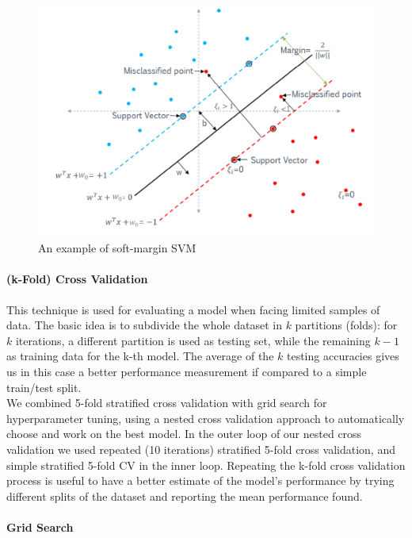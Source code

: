 \documentclass{article}
\begin{document}
\begin{figure}[h]
	\centering
	\includegraphics{svm}
	\caption{An example of soft-margin SVM}
\end{figure}


\paragraph{(k-Fold) Cross Validation}

This technique is used for evaluating a model when facing limited samples of data. The basic idea is to subdivide the whole dataset in $k$ partitions (folds): for $k$ iterations, a different partition is used as testing set, while the remaining $k-1$ as training data for the k-th model.
The average of the $k$ testing accuracies gives us in this case a better performance measurement if compared to a simple train/test split.\\
We combined 5-fold stratified cross validation with grid search for hyperparameter tuning, using a nested cross validation approach to automatically choose and work on the best model. In the outer loop of our nested cross validation we used repeated (10 iterations) stratified 5-fold cross validation, and simple stratified 5-fold CV in the inner loop. Repeating the k-fold cross validation process is useful to have a better estimate of the model's performance by trying different splits of the dataset and reporting the mean performance found\cite{repeated_kfold}.

\paragraph{Grid Search}
\end{document}
